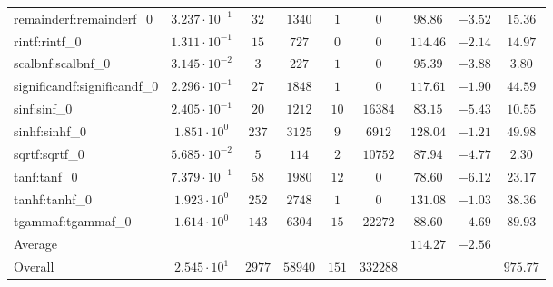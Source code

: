 \begin{tabular}{|l|c|c|c|c|c|c|c|c|}
remainderf:remainderf\_0     & $ 3.237 \cdot 10^{-1} $ & $ 32     $ & $ 1340  $ & $ 1   $ & $ 0      $ & $ 98.86       $ & $ -3.52   $ & $ 15.36   $ \\
rintf:rintf\_0               & $ 1.311 \cdot 10^{-1} $ & $ 15     $ & $ 727   $ & $ 0   $ & $ 0      $ & $ 114.46      $ & $ -2.14   $ & $ 14.97   $ \\
scalbnf:scalbnf\_0           & $ 3.145 \cdot 10^{-2} $ & $ 3      $ & $ 227   $ & $ 1   $ & $ 0      $ & $ 95.39       $ & $ -3.88   $ & $ 3.80    $ \\
significandf:significandf\_0 & $ 2.296 \cdot 10^{-1} $ & $ 27     $ & $ 1848  $ & $ 1   $ & $ 0      $ & $ 117.61      $ & $ -1.90   $ & $ 44.59   $ \\
sinf:sinf\_0                 & $ 2.405 \cdot 10^{-1} $ & $ 20     $ & $ 1212  $ & $ 10  $ & $ 16384  $ & $ 83.15       $ & $ -5.43   $ & $ 10.55   $ \\
sinhf:sinhf\_0               & $ 1.851 \cdot 10^{0}  $ & $ 237    $ & $ 3125  $ & $ 9   $ & $ 6912   $ & $ 128.04      $ & $ -1.21   $ & $ 49.98   $ \\
sqrtf:sqrtf\_0               & $ 5.685 \cdot 10^{-2} $ & $ 5      $ & $ 114   $ & $ 2   $ & $ 10752  $ & $ 87.94       $ & $ -4.77   $ & $ 2.30    $ \\
tanf:tanf\_0                 & $ 7.379 \cdot 10^{-1} $ & $ 58     $ & $ 1980  $ & $ 12  $ & $ 0      $ & $ 78.60       $ & $ -6.12   $ & $ 23.17   $ \\
tanhf:tanhf\_0               & $ 1.923 \cdot 10^{0}  $ & $ 252    $ & $ 2748  $ & $ 1   $ & $ 0      $ & $ 131.08      $ & $ -1.03   $ & $ 38.36   $ \\
tgammaf:tgammaf\_0           & $ 1.614 \cdot 10^{0}  $ & $ 143    $ & $ 6304  $ & $ 15  $ & $ 22272  $ & $ 88.60       $ & $ -4.69   $ & $ 89.93   $ \\
\hline
Average                      & $                     $ & $        $ & $       $ & $     $ & $        $ & $ 114.27      $ & $ -2.56   $ & $         $ \\
\hline
Overall                      & $ 2.545 \cdot 10^{1}  $ & $ 2977   $ & $ 58940 $ & $ 151 $ & $ 332288 $ & $             $ & $         $ & $ 975.77  $ \\
\hline
\end{tabular}
